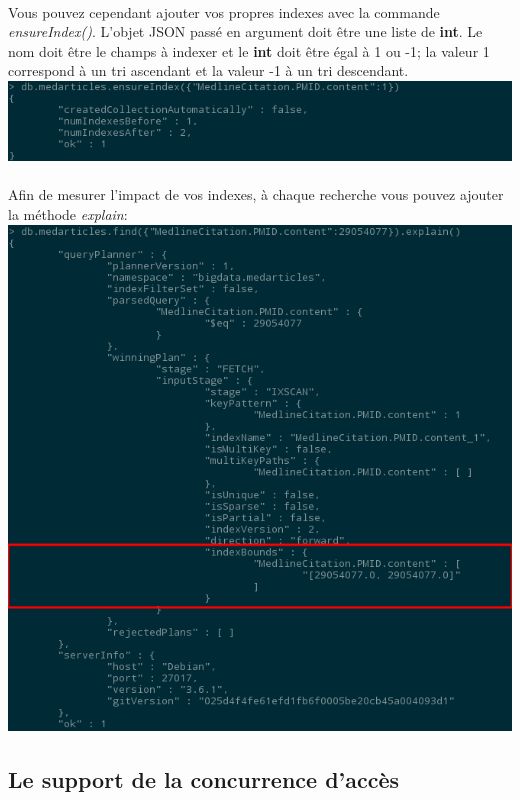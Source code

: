 \documentclass{article}
\begin{document}
  \paragraph{} Vous pouvez cependant ajouter vos propres indexes avec la commande
  \emph{ensureIndex()}. L'objet JSON passé en argument doit être une liste de \textbf{int}.
  Le nom doit être le champs à indexer et le \textbf{int} doit être égal à 1 ou -1; 
  la valeur 1 correspond à un tri ascendant et la valeur -1 à un tri descendant.
  \includegraphics[scale=0.8]{mongodb/ensureIndex.png}\\
  
  \paragraph{} Afin de mesurer l'impact de vos indexes, à chaque recherche vous pouvez
  ajouter la méthode \emph{explain}:\\
  \includegraphics[scale=0.8]{mongodb/find_explain2.png}\\
\subsection{Le support de la concurrence d’accès}
\end{document}

